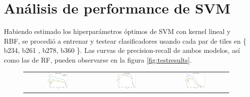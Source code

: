 \section {Análisis de performance de SVM}

Habiendo estimado los hiperparámetros óptimos de SVM con kernel lineal y RBF, se procedió a entrenar y testear clasificadores usando cada par de tiles en \{ b234, b261 , b278, b360 \}. Las curvas de precision-recall de ambos modelos, así como las de RF, pueden observarse en la figura \ref{fig:testresults}. \\

\begin{figure}[h!]
\begin{center}

\begin{tabular}{ccc}
\includegraphics[width=0.32\textwidth]{Kap3/test_results_train=b278Test=b234.png} &
\includegraphics[width=0.32\textwidth]{Kap3/test_results_train=b278Test=b261.png} &
\includegraphics[width=0.32\textwidth]{Kap3/test_results_train=b278Test=b360.png} \\


\end{tabular}
\end{center}
\end{figure}
